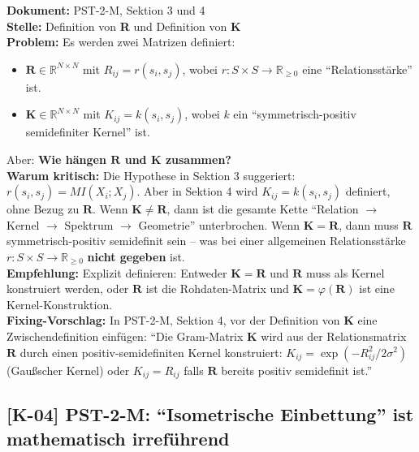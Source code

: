 \documentclass[11pt,a4paper]{article}
\newcommand{\K}[1]{\textbf{[K-#1]}}
\newcommand{\Dok}[1]{\textbf{Dokument:} #1\\}
\newcommand{\Stelle}[1]{\textbf{Stelle:} #1\\}
\newcommand{\Prob}[1]{\textbf{Problem:} #1\\}
\newcommand{\Krit}[1]{\textbf{Warum kritisch:} #1\\}
\newcommand{\Empf}[1]{\textbf{Empfehlung:} #1\\}
\newcommand{\Fix}[1]{\textbf{Fixing-Vorschlag:} #1\\}
\begin{document}
\Dok{PST-2-M, Sektion 3 und 4}
\Stelle{Definition von \textbf{R} und Definition von \textbf{K}}
\Prob{Es werden zwei Matrizen definiert:
\begin{itemize}
  \item $\mathbf{R} \in \mathbb{R}^{N \times N}$ mit $R_{ij} = r(s_i, s_j)$,
    wobei $r: S \times S \to \mathbb{R}_{\geq 0}$ eine ``Relationsst\"{a}rke'' ist.
  \item $\mathbf{K} \in \mathbb{R}^{N \times N}$ mit $K_{ij} = k(s_i, s_j)$,
    wobei $k$ ein ``symmetrisch-positiv semidefiniter Kernel'' ist.
\end{itemize}
Aber: \textbf{Wie h\"{a}ngen $\mathbf{R}$ und $\mathbf{K}$ zusammen?}}
\Krit{Die Hypothese in Sektion 3 suggeriert: $r(s_i, s_j) = MI(X_i; X_j)$.
Aber in Sektion 4 wird $K_{ij} = k(s_i, s_j)$ definiert, ohne Bezug zu
$\mathbf{R}$. Wenn $\mathbf{K} \neq \mathbf{R}$, dann ist die gesamte
Kette ``Relation $\to$ Kernel $\to$ Spektrum $\to$ Geometrie''
unterbrochen. Wenn $\mathbf{K} = \mathbf{R}$, dann muss $\mathbf{R}$
symmetrisch-positiv semidefinit sein -- was bei einer allgemeinen
Relationsst\"{a}rke $r: S \times S \to \mathbb{R}_{\geq 0}$ \textbf{nicht
gegeben} ist.}
\Empf{Explizit definieren: Entweder $\mathbf{K} = \mathbf{R}$ und
$\mathbf{R}$ muss als Kernel konstruiert werden, oder $\mathbf{R}$ ist
die Rohdaten-Matrix und $\mathbf{K} = \varphi(\mathbf{R})$ ist eine
Kernel-Konstruktion.}
\Fix{In PST-2-M, Sektion 4, vor der Definition von $\mathbf{K}$ eine
Zwischendefinition einf\"{u}gen: ``Die Gram-Matrix $\mathbf{K}$ wird aus
der Relationsmatrix $\mathbf{R}$ durch einen positiv-semidefiniten
Kernel konstruiert: $K_{ij} = \exp(-R_{ij}^2 / 2\sigma^2)$
(Gau\ss{}scher Kernel) oder $K_{ij} = R_{ij}$ falls $\mathbf{R}$ bereits
positiv semidefinit ist.''}

\subsection{\K{04} PST-2-M: ``Isometrische Einbettung'' ist mathematisch irref\"{u}hrend}
\end{document}
